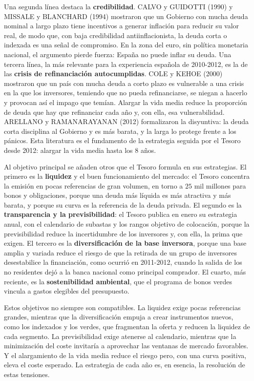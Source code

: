 \documentclass[10pt,a4paper]{article}
\begin{document}
Una segunda línea destaca la \textbf{credibilidad}. CALVO y GUIDOTTI (1990) y MISSALE y BLANCHARD (1994) mostraron que un Gobierno con mucha deuda nominal a largo plazo tiene incentivos a generar inflación para reducir su valor real, de modo que, con baja credibilidad antiinflacionista, la deuda corta o indexada es una señal de compromiso. En la zona del euro, sin política monetaria nacional, el argumento pierde fuerza: España no puede inflar su deuda. Una tercera línea, la más relevante para la experiencia española de 2010-2012, es la de las \textbf{crisis de refinanciación autocumplidas}. COLE y KEHOE (2000) mostraron que un país con mucha deuda a corto plazo es vulnerable a una crisis en la que los inversores, temiendo que no pueda refinanciarse, se niegan a hacerlo y provocan así el impago que temían. Alargar la vida media reduce la proporción de deuda que hay que refinanciar cada año y, con ella, esa vulnerabilidad. ARELLANO y RAMANARAYANAN (2012) formalizaron la disyuntiva: la deuda corta disciplina al Gobierno y es más barata, y la larga lo protege frente a los pánicos. Esta literatura es el fundamento de la estrategia seguida por el Tesoro desde 2012: alargar la vida media hasta los $8$ años.

Al objetivo principal se añaden otros que el Tesoro formula en sus estrategias. El primero es la \textbf{liquidez} y el buen funcionamiento del mercado: el Tesoro concentra la emisión en pocas referencias de gran volumen, en torno a $25$ mil millones para bonos y obligaciones, porque una deuda más líquida es más atractiva y más barata, y porque su curva es la referencia de la deuda privada. El segundo es la \textbf{transparencia y la previsibilidad}: el Tesoro publica en enero su estrategia anual, con el calendario de subastas y los rangos objetivo de colocación, porque la previsibilidad reduce la incertidumbre de los inversores y, con ella, la prima que exigen. El tercero es la \textbf{diversificación de la base inversora}, porque una base amplia y variada reduce el riesgo de que la retirada de un grupo de inversores desestabilice la financiación, como ocurrió en 2011-2012, cuando la salida de los no residentes dejó a la banca nacional como principal comprador. El cuarto, más reciente, es la \textbf{sostenibilidad ambiental}, que el programa de bonos verdes vincula a gastos elegibles del presupuesto.

Estos objetivos no siempre son compatibles. La liquidez exige pocas referencias grandes, mientras que la diversificación empuja a crear instrumentos nuevos, como los indexados y los verdes, que fragmentan la oferta y reducen la liquidez de cada segmento. La previsibilidad exige atenerse al calendario, mientras que la minimización del coste invitaría a aprovechar las ventanas de mercado favorables. Y el alargamiento de la vida media reduce el riesgo pero, con una curva positiva, eleva el coste esperado. La estrategia de cada año es, en esencia, la resolución de estas tensiones.
\end{document}
